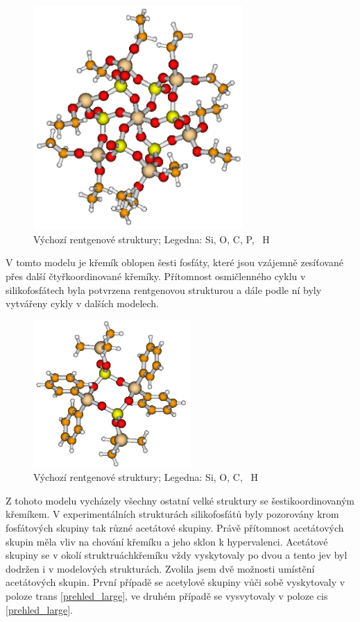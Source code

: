 \documentclass[
  digital, %
  table,   %
  lof,     %
  lot,     %
  oneside,
]{fithesis3}
\begin{document}
\begin{figure}
\begin{center}
\includegraphics[width=8cm]{rtg_6.png}
\caption{  Výchozí rentgenové struktury;  Legedna:  Si,  O,  C,   P, ~H}
\label{rtg_6}
\end{center}
\end{figure}
V tomto modelu je křemík oblopen šesti fosfáty, které jsou vzájemně zesíťované přes další čtyřkoordinované křemíky. Přítomnost osmičlenného cyklu v silikofosfátech byla potvrzena rentgenovou strukturou \cite{rtg_4} a dále podle ní byly vytvářeny cykly v dalších modelech.
\begin{figure}
\begin{center}
\includegraphics[width=6cm]{rtg_4_kruh_samotne.png}
\caption{ Výchozí rentgenové struktury;  Legedna:  Si,  O,  C, ~H}
\label{rtg_4}
\end{center}
\end{figure}
Z tohoto modelu vycházely všechny ostatní velké struktury se šestikoordinovaným křemíkem. V experimentálních strukturách silikofosfátů byly pozorovány krom fosfátových skupiny tak různé acetátové skupiny. Právě přítomnost acetátových skupin měla vliv na chování křemíku a jeho sklon k hypervalenci. Acetátové skupiny se v okolí struktruáchkřemíku vždy vyskytovaly po dvou a tento jev byl dodržen i v modelových strukturách. Zvolila jsem dvě možnosti umístění acetátových skupin. První případě se acetylové skupiny vůči sobě vyskytovaly v poloze trans \ref{prehled_large}, ve druhém případě se vysvytovaly v poloze cis \ref{prehled_large}.
\end{document}
